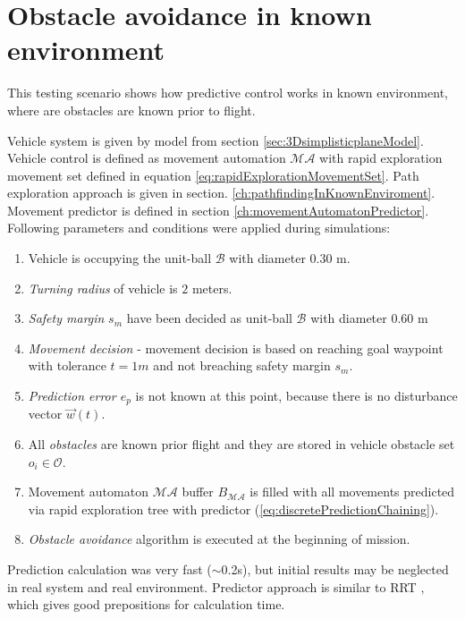 \newpage\section{Obstacle avoidance in known environment}
\noindent This testing scenario shows how predictive control works in known environment, where are obstacles are known prior to flight.

Vehicle system is given by model from section \ref{sec:3DsimplisticplaneModel}. Vehicle control is defined as movement automation $\mathscr{MA}$ with rapid exploration movement set defined in equation \ref{eq:rapidExplorationMovementSet}. Path exploration approach is given in section. 
\ref{ch:pathfindingInKnownEnviroment}. Movement predictor is defined in section \ref{ch:movementAutomatonPredictor}. Following parameters and conditions were applied during simulations:
\begin{enumerate}
    \item Vehicle is occupying the unit-ball $\mathscr{B}$ with diameter $0.30$ m.
    \item \textit{Turning radius} of vehicle is $2$ meters.
    \item \textit{Safety margin} $s_m$ have been decided as unit-ball $\mathscr{B}$ with diameter $0.60$ m
    \item \textit{Movement decision} - movement decision is based on reaching goal waypoint with tolerance $t=1m$ and not breaching safety margin $s_m$.
    \item \textit{Prediction error $e_p$} is not known at this point, because there is no disturbance vector $\vec{w}(t)$.
    \item All \textit{obstacles} are known prior flight and they are stored in vehicle obstacle set $o_i\in\mathscr{O}$.
    \item Movement automaton $\mathscr{MA}$ buffer $B_{\mathscr{MA}}$ is filled with all movements predicted via rapid exploration tree with predictor (\ref{eq:discretePredictionChaining}).
    \item \textit{Obstacle avoidance} algorithm is executed at the beginning of mission.
\end{enumerate}

\noindent Prediction calculation was very fast ($\sim$0.2s), but initial results may be neglected in real system and real environment. Predictor approach is similar to RRT \cite{kuffner2000rrt}, which gives good prepositions for calculation time.

